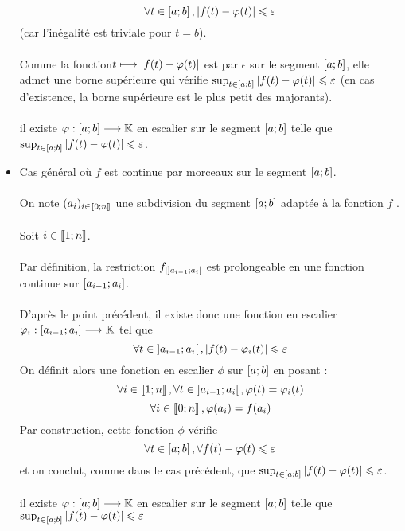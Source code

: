 \begin{dem}
\begin{itemize}
        \[\forall t \in \left[a;b\right] , \left\lvert f (t) - \varphi(t)\right\rvert \leqslant \varepsilon\]
        (car l’inégalité est triviale pour \(t = b\)).\\~\\
        Comme la fonction\( t \longmapsto \left\lvert f (t) - \varphi(t)\right\rvert\) est par \(\epsilon\) sur le segment \(\left[a;b\right]\), elle admet une borne supérieure qui vérifie \(\sup_{t\in\left[a;b\right]}\left\lvert f (t) - \varphi(t)\right\rvert \leqslant \varepsilon\) (en cas d’existence, la borne supérieure est le plus petit des majorants).\\~\\
        \conclusion il existe \(\varphi : \left[a;b\right] \longrightarrow \mathbb{K}\) en escalier sur le segment \(\left[a;b\right]\) telle que \(\sup_{t\in\left[a;b\right]}\left\lvert f (t) - \varphi(t)\right\rvert \leqslant \varepsilon\).

    \item Cas général où \(f\) est continue par morceaux sur le segment \(\left[a;b\right]\).\\~\\
        On note \((a_i)_{i\in\left\llbracket0;n\right\rrbracket}\) une subdivision du segment \(\left[a;b\right]\) adaptée à la fonction \(f\) .\\~\\
        Soit \(i \in \left\llbracket1;n\right\rrbracket\).\\~\\
        Par définition, la restriction \(f_{|\left]a_{i-1};a_i\right[}\) est prolongeable en une fonction continue sur \(\left[a_{i-1};a_i\right]\).\\~\\
        D’après le point précédent, il existe donc une fonction en escalier \(\varphi_i : \left[a_{i-1};a_i\right] \longrightarrow \mathbb{K}\) tel que
        \[\forall t \in \left]a_{i-1};a_i\right[ , \left\lvert f (t) - \varphi_i(t)\right\rvert \leqslant \varepsilon\]
        On définit alors une fonction en escalier \(\phi\) sur \(\left[a;b\right]\) en posant :
        \[\forall i \in \left\llbracket1;n\right\rrbracket, \forall t \in \left]a_{i-1};a_i\right[ , \varphi(t) = \varphi_i(t)\]
        \[\forall i \in \left\llbracket0;n\right\rrbracket, \varphi (a_i) = f (a_i)\]
        Par construction, cette fonction \(\phi\) vérifie
        \[\forall t \in \left[a;b\right] , \forall{f (t) - \varphi(t)} \leqslant \varepsilon\]
        et on conclut, comme dans le cas précédent, que \(\sup_{t\in\left[a;b\right]}\left\lvert f (t) - \varphi(t)\right\rvert\leqslant \varepsilon\).\\~\\
        \conclusion il existe \(\varphi : \left[a;b\right] \longrightarrow \mathbb{K}\) en escalier sur le segment \(\left[a;b\right]\) telle que \(\sup_{t\in\left[a;b\right]} \left\lvert f (t) - \varphi(t)\right\rvert \leqslant \varepsilon\)\\~\\

\end{itemize}
\end{dem}
